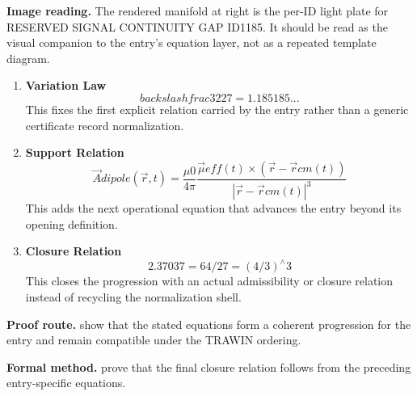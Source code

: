 \begin{samepage}
\noindent\begin{minipage}[t]{0.45\linewidth}
\vspace{0pt}
\raggedright
\scriptsize\textbf{Image reading.} The rendered manifold at right is the per-ID light plate for RESERVED SIGNAL CONTINUITY GAP ID1185. It should be read as the visual companion to the entry's equation layer, not as a repeated template diagram.\par
\end{minipage}\hfill
\begin{minipage}[t]{0.53\linewidth}
\vspace*{-0.10in}
\raggedright
{}
\end{minipage}
\end{samepage}

\clearpage


\begin{enumerate}[leftmargin=1.6em,itemsep=9pt,topsep=6pt]
\item \textbf{Variation Law}
\[
backslash frac{32}{27}=1.185185...
\]
This fixes the first explicit relation carried by the entry rather than a generic certificate record normalization.

\item \textbf{Support Relation}
\[
\vec{A} {dipole}(\vec{r},t) = \frac{\mu {0}}{4\pi}\frac{\vec{\mu} {eff}(t)\times(\vec{r}-\vec{r} {cm}(t))}{|\vec{r}-\vec{r} {cm}(t)|^{3}}
\]
This adds the next operational equation that advances the entry beyond its opening definition.

\item \textbf{Closure Relation}
\[
2.37037=64/27=(4/3)^{\wedge}3
\]
This closes the progression with an actual admissibility or closure relation instead of recycling the normalization shell.
\end{enumerate}

\textbf{Proof route.} show that the stated equations form a coherent progression for the entry and remain compatible under the TRAWIN ordering.

\textbf{Formal method.} prove that the final closure relation follows from the preceding entry-specific equations.

\medskip
{}

